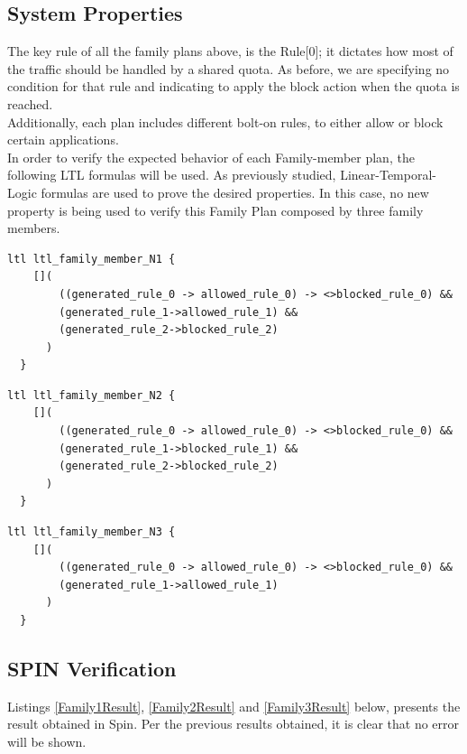 \subsection{System Properties}
\noindent The key rule of all the family plans above, is the Rule[0]; it dictates how most of the traffic should be handled by a shared quota. As before, we are specifying no condition for that rule and indicating to apply the block action when the quota is reached.  \\

Additionally, each plan includes different bolt-on rules, to either allow or block certain applications. \\

In order to verify the expected behavior of each Family-member plan, the following LTL formulas will be used. As previously studied, Linear-Temporal-Logic formulas are used to prove the desired properties. In this case, no new property is being used to verify this Family Plan composed by three family members.  \\

\singlespacing
\begin{lstlisting}[caption=Family Member\#1 LTL,
  label=Family1LTL]
  ltl ltl_family_member_N1 {
    []( 
        ((generated_rule_0 -> allowed_rule_0) -> <>blocked_rule_0) &&
        (generated_rule_1->allowed_rule_1) &&
        (generated_rule_2->blocked_rule_2) 
      ) 
  }
\end{lstlisting}
\doublespacing

\singlespacing
\begin{lstlisting}[caption=Family Member\#2 LTL,
  label=Family2LTL]
  ltl ltl_family_member_N2 {
    []( 
        ((generated_rule_0 -> allowed_rule_0) -> <>blocked_rule_0) &&
        (generated_rule_1->blocked_rule_1) &&
        (generated_rule_2->blocked_rule_2) 
      ) 
  }
\end{lstlisting}
\doublespacing

\singlespacing
\begin{lstlisting}[caption=Family Member\#3 LTL,
  label=Family3LTL]
  ltl ltl_family_member_N3 {
    []( 
        ((generated_rule_0 -> allowed_rule_0) -> <>blocked_rule_0) &&
        (generated_rule_1->allowed_rule_1)
      )
  }
\end{lstlisting}
\doublespacing

\subsection{SPIN Verification}
\noindent 
Listings \ref{Family1Result}, \ref{Family2Result} and \ref{Family3Result} below, presents the result obtained in Spin. Per the previous results obtained, it is clear that no error will be shown. 

